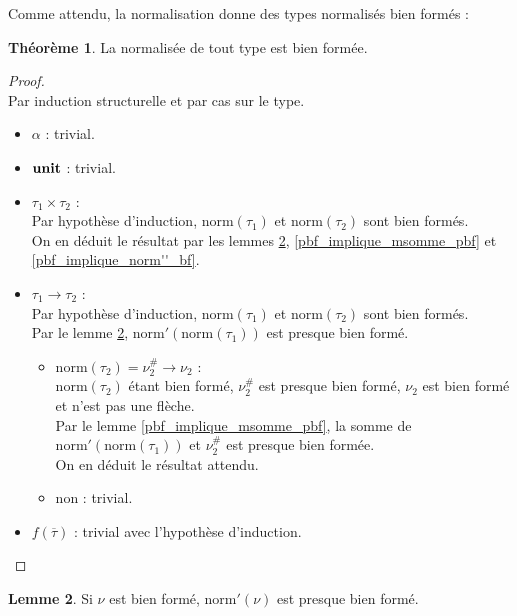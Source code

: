 \documentclass[a4paper]{report}
\newenvironment{preuve} 
  {\begin{proof}~\\} 
  {\end{proof}}
\theoremstyle{definition}
\newtheorem{theoreme}{Théorème}
\newtheorem{lemme}[theoreme]{Lemme}
\newcommand{\unit}{\bold{unit}}
\newcommand{\norm}{\mathrm{norm}}
\begin{document}
Comme attendu, la normalisation donne des types normalisés bien formés :

\begin{theoreme} \label{norm_bf}
  La normalisée de tout type est bien formée.
\end{theoreme}

\begin{preuve}
  Par induction structurelle et par cas sur le type.
  \begin{itemize}[label={\textbf{Cas}}]
    \item
      $\alpha$ : trivial.
    \item
      $\unit$ : trivial.
    \item
      $\tau_1 \times \tau_2$ : \\
      Par hypothèse d'induction, $\norm (\tau_1)$ et $\norm (\tau_2)$ sont bien formés. \\
      On en déduit le résultat par les lemmes \ref{bf_implique_norm'_pbf}, \ref{pbf_implique_msomme_pbf} et \ref{pbf_implique_norm''_bf}.
    \item
      $\tau_1 \rightarrow \tau_2$ : \\
      Par hypothèse d'induction, $\norm (\tau_1)$ et $\norm (\tau_2)$ sont bien formés. \\
      Par le lemme \ref{bf_implique_norm'_pbf}, $\norm' (\norm (\tau_1))$ est presque bien formé.
      \begin{itemize}[label={\textbf{Si}}]
        \item
          $\norm (\tau_2) = \nu^\#_2 \rightarrow \nu_2$ : \\
          $\norm (\tau_2)$ étant bien formé, $\nu^\#_2$ est presque bien formé, $\nu_2$ est bien formé et n'est pas une flèche. \\
          Par le lemme \ref{pbf_implique_msomme_pbf}, la somme de $\norm' (\norm (\tau_1))$ et $\nu^\#_2$ est presque bien formée. \\
          On en déduit le résultat attendu.
        \item
          non : trivial.
      \end{itemize}
    \item
      $f (\overline \tau)$ : trivial avec l'hypothèse d'induction.
  \end{itemize}
\end{preuve}

\begin{lemme} \label{bf_implique_norm'_pbf}
  Si $\nu$ est bien formé, $\norm' (\nu)$ est presque bien formé.
\end{lemme}
\end{document}

